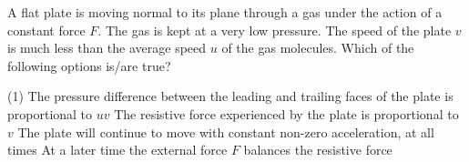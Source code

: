 
    \item A flat plate is moving normal to its plane through a gas under the action of a constant force \( F \). The gas is kept at a very low pressure. The speed of the plate \( v \) is much less than the average speed \( u \) of the gas molecules. Which of the following options is/are true?
        \begin{tasks}(1)
            \task The pressure difference between the leading and trailing faces of the plate is proportional to \( uv \)
            \task The resistive force experienced by the plate is proportional to \( v \)
            \task The plate will continue to move with constant non-zero acceleration, at all times
            \task At a later time the external force \( F \) balances the resistive force
        \end{tasks}
